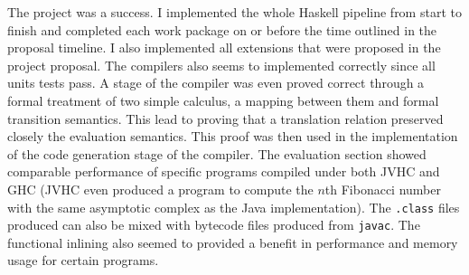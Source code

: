\documentclass[float=false, crop=false]{standalone}
\begin{document}







The project was a success. I implemented the whole Haskell
pipeline from start to finish and completed each work package on or
before the time outlined in the proposal timeline. I also implemented
all extensions that were proposed in the project proposal. 
The compilers also seems to implemented correctly since all units
tests pass. A stage of the compiler was even proved correct through
a formal treatment of two simple calculus, a mapping between them
and formal transition semantics. This lead to proving that a translation
relation preserved closely the evaluation semantics. This proof was then 
used in the implementation of the code generation stage of the compiler.
The evaluation section showed comparable performance of specific programs
compiled under both JVHC and GHC (JVHC even produced a program to compute
the $n$th Fibonacci number with the same asymptotic complex as the Java
implementation). The \verb|.class| files produced can also be mixed with 
bytecode files produced from \verb|javac|. The functional inlining also
seemed to provided a benefit in performance and memory usage for certain
programs. 



\end{document}
